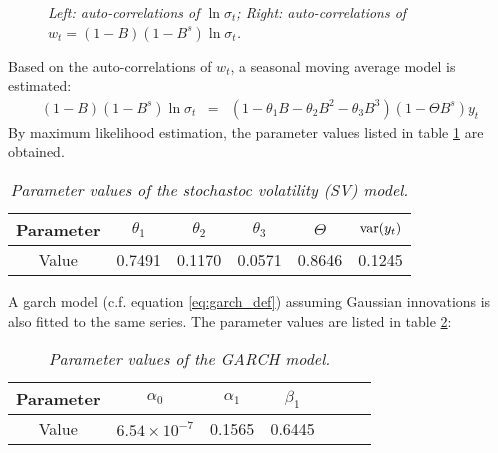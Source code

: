 \begin{figure}[htb!]
  \centering
  \caption{\small \it Left: auto-correlations of $\ln \sigma_t$;
    Right: auto-correlations of $w_t = (1-B)(1-B^s) \ln \sigma_t$.}
\end{figure}

Based on the auto-correlations of $w_t$, a seasonal moving average
model is estimated:
\begin{eqnarray*}
  (1-B)(1-B^s) \ln\sigma_t &=& (1-\theta_1B - \theta_2B^2 - \theta_3
  B^3)(1 - \Theta B^s)y_t
\end{eqnarray*}
By maximum likelihood estimation, the parameter values listed in table
\ref{tab:volvo_15_sv_param} are obtained.
\begin{table}[htb!]
  \centering
  \begin{tabular}{|c|c|c|c|c|c|}
  \hline
  Parameter & $\theta_1$ & $\theta_2$ & $\theta_3$ & $\Theta$ & 
 $\text{var}(y_t)$ \\
 \hline
 Value & 0.7491 & 0.1170 & 0.0571 & 0.8646 & 0.1245 \\
  \hline
  \end{tabular}
  \caption{\small \it Parameter values of the stochastoc volatility
    (SV) model.}
  \label{tab:volvo_15_sv_param}
\end{table}

A \gls{garch} model (c.f. equation \ref{eq:garch_def}) assuming Gaussian
innovations is also fitted to the same series. The parameter values
are listed in table \ref{tab:volvo_15_garch_param}:
\begin{table}[htb!]
  \centering
  \begin{tabular}{|c|c|c|c|c|c|c|}
  \hline
  Parameter & $\alpha_0$ & $\alpha_1$ & $\beta_{1}$ \\
  \hline
  Value & $6.54 \times 10^{-7}$ & 0.1565 & 0.6445\\
  \hline
  \end{tabular}
  \caption{\small \it Parameter values of the GARCH model.}
  \label{tab:volvo_15_garch_param}
\end{table}

